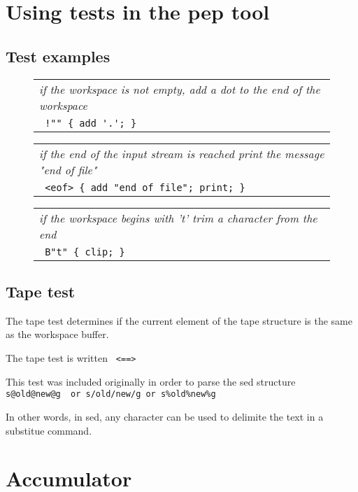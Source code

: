 \documentclass[a4paper,12pt]{article}
\begin{document}
\section{Using tests in the pep tool}
 
\subsection{Test examples}
 \begin{figure}
 \begin{tabular}{ l }
 \emph{ if the workspace is not empty, add a dot to the end of the workspace } \\ 
 \verb| !"" { add '.'; } |
 \end{tabular} 
 \end{figure}
 \begin{figure}
 \begin{tabular}{ l }
 \emph{ if the end of the input stream is reached print the message "end of file" } \\ 
 \verb| <eof> { add "end of file"; print; } |
 \end{tabular} 
 \end{figure}
 \begin{figure}
 \begin{tabular}{ l }
 \emph{ if the workspace begins with 't' trim a character from the end } \\ 
 \verb| B"t" { clip; } |
 \end{tabular} 
 \end{figure}

\subsection{Tape test}

 The tape test determines if the current element of the tape structure is the
 same as the workspace buffer.

 The tape test is written 
 \verb| <==> |


 This test was included originally in order to parse the sed structure 
 \verb| s@old@new@g  or s/old/new/g or s%old%new%g |

 In other words, in sed, any character can be used to delimite the
 text in a substitue command.

\section{Accumulator}
\end{document}
